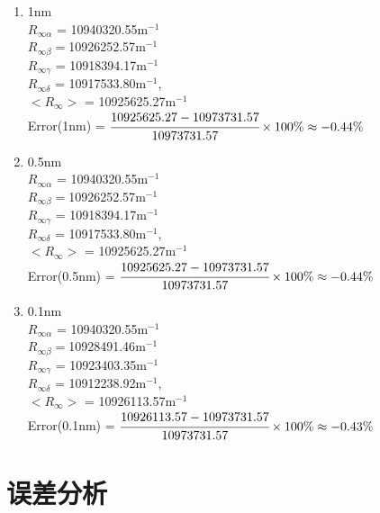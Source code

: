 \documentclass[a4paper]{article}
\begin{document}
\begin{enumerate}
\begin{enumerate}
\item 1nm\\
$R_{\infty\alpha}$ = 10940320.55$\text{m}^{-1}$\\
$R_{\infty\beta} = $10926252.57$\text{m}^{-1}$\\
$R_{\infty\gamma}$ = 10918394.17$\text{m}^{-1}$\\
$R_{\infty\delta}$ = 10917533.80$\text{m}^{-1}$,\\
$<R_{\infty}>$ = 10925625.27$\text{m}^{-1}$\\
Error(1nm) = $\cfrac{10925625.27 - 10973731.57}{10973731.57}\times 100\% \approx -0.44\%$
\item 0.5nm\\
$R_{\infty\alpha}$ = 10940320.55$\text{m}^{-1}$\\
$R_{\infty\beta} = $10926252.57$\text{m}^{-1}$\\
$R_{\infty\gamma}$ = 10918394.17$\text{m}^{-1}$\\
$R_{\infty\delta}$ = 10917533.80$\text{m}^{-1}$,\\
$<R_{\infty}>$ = 10925625.27$\text{m}^{-1}$\\
Error(0.5nm) = $\cfrac{10925625.27 - 10973731.57}{10973731.57}\times 100\% \approx -0.44\%$
\item 0.1nm\\
$R_{\infty\alpha}$ = 10940320.55$\text{m}^{-1}$\\
$R_{\infty\beta} = $10928491.46$\text{m}^{-1}$\\
$R_{\infty\gamma}$ = 10923403.35$\text{m}^{-1}$\\
$R_{\infty\delta}$ = 10912238.92$\text{m}^{-1}$,\\
$<R_{\infty}>$ = 10926113.57$\text{m}^{-1}$\\
Error(0.1nm) = $\cfrac{10926113.57 - 10973731.57}{10973731.57}\times 100\% \approx -0.43\%$
\end{enumerate}
\end{enumerate}

\section{误差分析}

\end{document}
